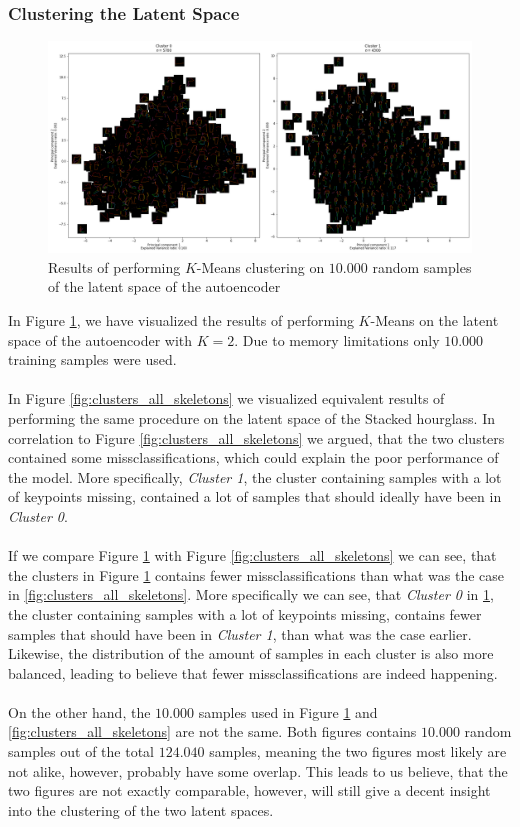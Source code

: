 \documentclass[./main.tex]{subfiles}
\begin{document}
\subsubsection{Clustering the Latent Space}
\begin{figure}[htbp]
    \centering
    \includegraphics[width = \textwidth]{./entities/SHG_AE_clusters.png}
    \caption{Results of performing $K$-Means clustering on $10.000$ random samples of the latent space of the autoencoder}
    \label{fig:SHG_AE_clusters}
\end{figure}
\noindent In Figure \ref{fig:SHG_AE_clusters}, we have visualized the results of performing $K$-Means on the latent space of the autoencoder with $K = 2$. Due to memory limitations only $10.000$ training samples were used. 
\\
\\
In Figure \ref{fig:clusters_all_skeletons} we visualized equivalent results of performing the same procedure on the latent space of the Stacked hourglass. In correlation to Figure \ref{fig:clusters_all_skeletons} we argued, that the two clusters contained some missclassifications, which could explain the poor performance of the model. More specifically, \textit{Cluster 1}, the cluster containing samples with a lot of keypoints missing, contained a lot of samples that should ideally have been in \textit{Cluster 0}.
\\
\\
If we compare Figure \ref{fig:SHG_AE_clusters} with Figure \ref{fig:clusters_all_skeletons} we can see, that the clusters in Figure \ref{fig:SHG_AE_clusters} contains fewer missclassifications than what was the case in \ref{fig:clusters_all_skeletons}. More specifically we can see, that \textit{Cluster 0} in  \ref{fig:SHG_AE_clusters}, the cluster containing samples with a lot of keypoints missing, contains fewer samples that should have been in \textit{Cluster 1}, than what was the case earlier. Likewise, the distribution of the amount of samples in each cluster is also more balanced, leading to believe that fewer missclassifications are indeed happening.
\\
\\
On the other hand, the $10.000$ samples used in Figure  \ref{fig:SHG_AE_clusters} and \ref{fig:clusters_all_skeletons} are not the same. Both figures contains $10.000$ random samples out of the total $124.040$ samples, meaning the two figures most likely are not alike, however, probably have some overlap. This leads to us believe, that the two figures are not exactly comparable, however, will still give a decent insight into the clustering of the two latent spaces.
\end{document}

